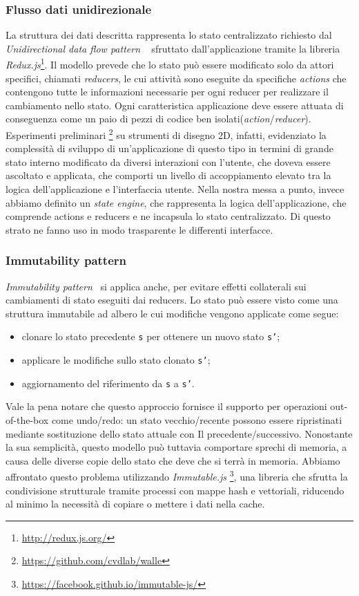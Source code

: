 \subsubsection*{Flusso dati unidirezionale}
\noindent
La struttura dei dati descritta rappresenta lo stato centralizzato richiesto dal \emph{Unidirectional data flow pattern}
~\cite{uniflow} sfruttato dall'applicazione tramite la libreria \emph{Redux.js}\footnote{\url{http://redux.js.org/}}.
Il modello prevede che lo stato può essere modificato solo da attori specifici, chiamati \emph{reducers},
le cui attività sono eseguite da specifiche \emph{actions} che contengono tutte le informazioni necessarie per
ogni reducer per realizzare il cambiamento nello stato. Ogni caratteristica applicazione deve essere attuata di conseguenza
come un paio di pezzi di codice ben isolati(\emph{action}/\emph{reducer}). Esperimenti preliminari
\footnote{\url{https://github.com/cvdlab/walle}} su strumenti di disegno 2D, infatti,
evidenziato la complessità di sviluppo di un'applicazione di questo tipo in termini di grande stato interno modificato
da diversi interazioni con l'utente, che doveva essere ascoltato e applicata,
che comporti un livello di accoppiamento elevato tra la logica dell'applicazione e l'interfaccia utente.
Nella nostra messa a punto, invece abbiamo definito un \emph{state engine}, che rappresenta la logica dell'applicazione,
che comprende actions e reducers e ne incapsula lo stato centralizzato.
Di questo strato ne fanno uso in modo trasparente le differenti interfacce.

\subsubsection*{Immutability pattern}
\emph{Immutability pattern}~\cite{immutability} si applica anche, per evitare effetti collaterali sui cambiamenti di stato
eseguiti dai reducers. Lo stato può essere visto come una struttura immutabile ad albero le cui modifiche vengono applicate come segue:
\begin{itemize}
  \item clonare lo stato precedente \texttt{s} per ottenere un nuovo stato \texttt{s'};
  \item applicare le modifiche sullo stato clonato \texttt{s'};
  \item aggiornamento del riferimento da \texttt{s} a \texttt{s'}.
\end{itemize}
Vale la pena notare che questo approccio fornisce il supporto per operazioni out-of-the-box come undo/redo:
un stato vecchio/recente possono essere ripristinati mediante sostituzione dello stato attuale con Il precedente/successivo.
Nonostante la sua semplicità, questo modello può tuttavia comportare sprechi di memoria, a causa delle diverse copie dello
stato che deve che si terrà in memoria. Abbiamo affrontato questo problema utilizzando \emph{Immutable.js}
\footnote{\url{https://facebook.github.io/immutable-js/}}, una libreria che sfrutta la condivisione strutturale tramite
processi con mappe hash e vettoriali, riducendo al minimo la necessità di copiare o mettere i dati nella cache.


